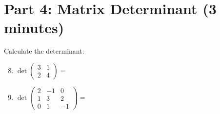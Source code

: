 \documentclass{article}
\begin{document}
\section*{Part 4: Matrix Determinant (3 minutes)}
Calculate the determinant:

\begin{enumerate}
	\setcounter{enumi}{7}
	\item $\det\begin{pmatrix} 3 & 1 \\ 2 & 4 \end{pmatrix} = $ \underline{\hspace{3cm}}
	
	\item $\det\begin{pmatrix} 2 & -1 & 0 \\ 1 & 3 & 2 \\ 0 & 1 & -1 \end{pmatrix} = $ \underline{\hspace{3cm}}
\end{enumerate}
\end{document}

